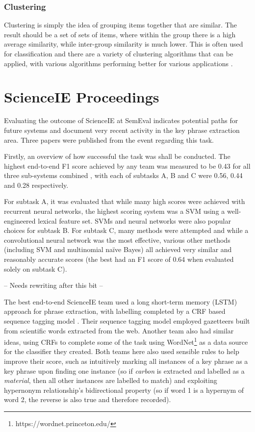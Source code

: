 \subsubsection*{Clustering}
Clustering is simply the idea of grouping items together that are similar. The result should be a set of sets of items, where within the group there is a high average similarity, while inter-group similarity is much lower. This is often used for classification and there are a variety of clustering algorithms that can be applied, with various algorithms performing better for various applications \cite{Rai2010}.

\section{ScienceIE Proceedings}
Evaluating the outcome of ScienceIE at SemEval indicates potential paths for future systems and document very recent activity in the key phrase extraction area. Three papers were published from the event regarding this task.

Firstly, an overview of how successful the task was shall be conducted. The highest end-to-end F1 score achieved by any team was measured to be 0.43 for all three sub-systems combined \cite{Augenstein2017}, with each of subtasks A, B and C were 0.56, 0.44 and 0.28 respectively. 

For subtask A, it was evaluated that while many high scores were achieved with recurrent neural networks, the highest scoring system was a SVM using a well-engineered lexical feature set. SVMs and neural networks were also popular choices for subtask B. For subtask C, many methods were attempted and while a convolutional neural network was the most effective, various other methods (including SVM and multinomial naïve Bayes) all achieved very similar and reasonably accurate scores (the best had an F1 score of 0.64 when evaluated solely on subtask C).

-- Needs rewriting after this bit --

The best end-to-end ScienceIE team used a long short-term memory (LSTM) approach for phrase extraction, with labelling completed by a CRF based sequence tagging model \cite{Ammar2017}. Their sequence tagging model employed gazetteers built from scientific words extracted from the web. Another team \cite{Marsi2017} also had similar ideas, using CRFs to complete some of the task using WordNet\footnote{https://wordnet.princeton.edu/} as a data source for the classifier they created. Both teams here also used sensible rules to help improve their score, such as intuitively marking all instances of a key phrase as a key phrase upon finding one instance (so if \textit{carbon} is extracted and labelled as a \textit{material}, then all other instances are labelled to match) and exploiting hypernonym relationship’s bidirectional property (so if word 1 is a hypernym of word 2, the reverse is also true and therefore recorded). 

